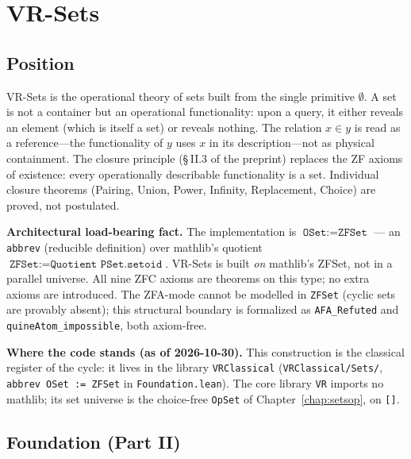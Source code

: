 \chapter{VR-Sets}
\label{chap:sets}

\section{Position}
\label{sec:sets_position}

VR-Sets is the operational theory of sets built from the single primitive
$\emptyset$.  A set is not a container but an operational functionality:
upon a query, it either reveals an element (which is itself a set) or
reveals nothing.  The relation $x \in y$ is read as a reference---the
functionality of $y$ uses $x$ in its description---not as physical
containment.  The closure principle (§\,II.3 of the preprint) replaces
the ZF axioms of existence: every operationally describable functionality
is a set.  Individual closure theorems (Pairing, Union, Power, Infinity,
Replacement, Choice) are proved, not postulated.

\textbf{Architectural load-bearing fact.} The implementation is
$\texttt{OSet} := \texttt{ZFSet}$ --- an \texttt{abbrev} (reducible
definition) over mathlib's quotient $\texttt{ZFSet} := \texttt{Quotient
PSet.setoid}$.  VR-Sets is built \emph{on} mathlib's ZFSet, not in a
parallel universe.  All nine ZFC axioms are theorems on this type; no
extra axioms are introduced.  The ZFA-mode cannot be modelled in
\texttt{ZFSet} (cyclic sets are provably absent); this structural
boundary is formalized as \texttt{AFA\_Refuted} and
\texttt{quineAtom\_impossible}, both axiom-free.

\textbf{Where the code stands (as of 2026-10-30).}  This construction is the
classical register of the cycle: it lives in the library \texttt{VRClassical}
(\texttt{VRClassical/Sets/}, \texttt{abbrev OSet := ZFSet} in
\texttt{Foundation.lean}).  The core library \texttt{VR} imports no mathlib; its set
universe is the choice-free \texttt{OpSet} of Chapter~\ref{chap:setsop}, on
\texttt{[]}.

\section{Foundation (Part II)}
\label{sec:sets_foundation}

